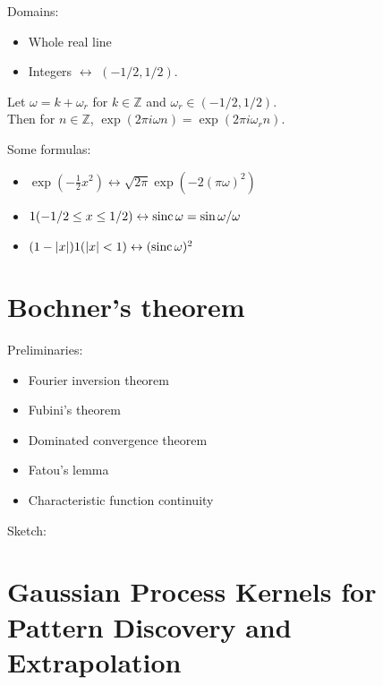 \documentclass[twoside,11pt]{article}
\numberwithin{equation}{section}
\begin{document}
Domains:
%
\begin{itemize}
    \item Whole real line
    \item Integers $\leftrightarrow$ $(-1/2, 1/2)$.
\end{itemize}
%
Let $\omega = k + \omega_r$ for $k \in \mathbb{Z}$ and $\omega_r \in (-1/2, 1/2)$.\\
Then for $n \in \mathbb{Z}$, $\exp(2\pi i \omega n) = \exp(2\pi i \omega_r n)$.

Some formulas:
%
%
\begin{itemize}
    \item $\exp\left(-\frac{1}{2} x^2 \right) \leftrightarrow \sqrt{2\pi} \exp\left(-2 (\pi \omega)^2 \right)$
    \item $1(-1/2 \le x \le 1/2) \leftrightarrow \mathrm{sinc}\, \omega = \sin \omega / \omega$
    \item $(1 - |x|) 1(|x| < 1) \leftrightarrow (\mathrm{sinc}\, \omega)^2$
\end{itemize}
%

%



\newpage
\section*{Bochner's theorem}

Preliminaries:
%
\begin{itemize}
    \item Fourier inversion theorem
    \item Fubini's theorem
    \item Dominated convergence theorem
    \item Fatou's lemma
    \item Characteristic function continuity
\end{itemize}
%
Sketch:




\newpage
\section*{Gaussian Process Kernels for Pattern Discovery and Extrapolation}
\end{document}
